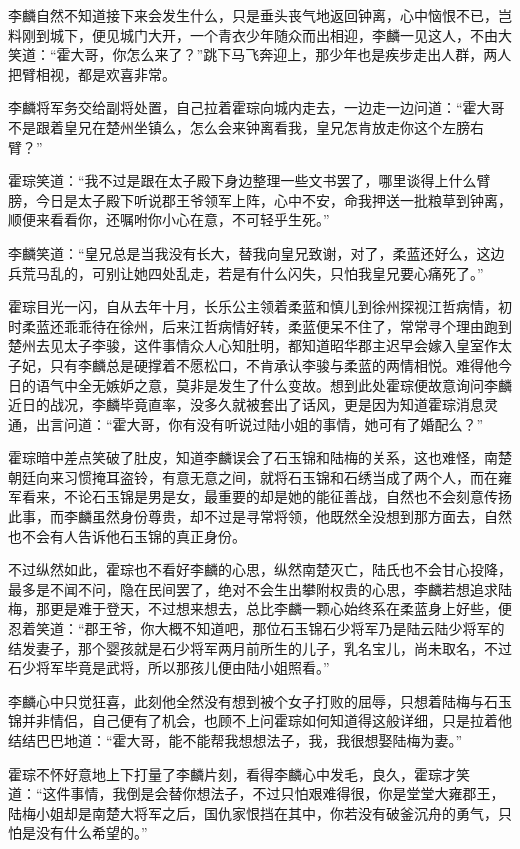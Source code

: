 李麟自然不知道接下来会发生什么，只是垂头丧气地返回钟离，心中恼恨不已，岂料刚到城下，便见城门大开，一个青衣少年随众而出相迎，李麟一见这人，不由大笑道：“霍大哥，你怎么来了？”跳下马飞奔迎上，那少年也是疾步走出人群，两人把臂相视，都是欢喜非常。

李麟将军务交给副将处置，自己拉着霍琮向城内走去，一边走一边问道：“霍大哥不是跟着皇兄在楚州坐镇么，怎么会来钟离看我，皇兄怎肯放走你这个左膀右臂？”

霍琮笑道：“我不过是跟在太子殿下身边整理一些文书罢了，哪里谈得上什么臂膀，今日是太子殿下听说郡王爷领军上阵，心中不安，命我押送一批粮草到钟离，顺便来看看你，还嘱咐你小心在意，不可轻乎生死。”

李麟笑道：“皇兄总是当我没有长大，替我向皇兄致谢，对了，柔蓝还好么，这边兵荒马乱的，可别让她四处乱走，若是有什么闪失，只怕我皇兄要心痛死了。”

霍琮目光一闪，自从去年十月，长乐公主领着柔蓝和慎儿到徐州探视江哲病情，初时柔蓝还乖乖待在徐州，后来江哲病情好转，柔蓝便呆不住了，常常寻个理由跑到楚州去见太子李骏，这件事情众人心知肚明，都知道昭华郡主迟早会嫁入皇室作太子妃，只有李麟总是硬撑着不愿松口，不肯承认李骏与柔蓝的两情相悦。难得他今日的语气中全无嫉妒之意，莫非是发生了什么变故。想到此处霍琮便故意询问李麟近日的战况，李麟毕竟直率，没多久就被套出了话风，更是因为知道霍琮消息灵通，出言问道：“霍大哥，你有没有听说过陆小姐的事情，她可有了婚配么？”

霍琮暗中差点笑破了肚皮，知道李麟误会了石玉锦和陆梅的关系，这也难怪，南楚朝廷向来习惯掩耳盗铃，有意无意之间，就将石玉锦和石绣当成了两个人，而在雍军看来，不论石玉锦是男是女，最重要的却是她的能征善战，自然也不会刻意传扬此事，而李麟虽然身份尊贵，却不过是寻常将领，他既然全没想到那方面去，自然也不会有人告诉他石玉锦的真正身份。

不过纵然如此，霍琮也不看好李麟的心思，纵然南楚灭亡，陆氏也不会甘心投降，最多是不闻不问，隐在民间罢了，绝对不会生出攀附权贵的心思，李麟若想追求陆梅，那更是难于登天，不过想来想去，总比李麟一颗心始终系在柔蓝身上好些，便忍着笑道：“郡王爷，你大概不知道吧，那位石玉锦石少将军乃是陆云陆少将军的结发妻子，那个婴孩就是石少将军两月前所生的儿子，乳名宝儿，尚未取名，不过石少将军毕竟是武将，所以那孩儿便由陆小姐照看。”

李麟心中只觉狂喜，此刻他全然没有想到被个女子打败的屈辱，只想着陆梅与石玉锦并非情侣，自己便有了机会，也顾不上问霍琮如何知道得这般详细，只是拉着他结结巴巴地道：“霍大哥，能不能帮我想想法子，我，我很想娶陆梅为妻。”

霍琮不怀好意地上下打量了李麟片刻，看得李麟心中发毛，良久，霍琮才笑道：“这件事情，我倒是会替你想法子，不过只怕艰难得很，你是堂堂大雍郡王，陆梅小姐却是南楚大将军之后，国仇家恨挡在其中，你若没有破釜沉舟的勇气，只怕是没有什么希望的。”

